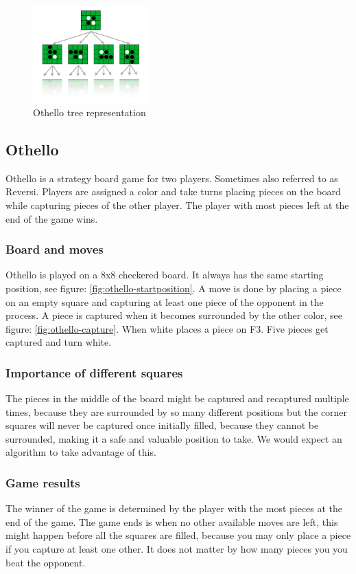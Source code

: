 \documentclass[10pt,letterpaper]{article}
\begin{document}
\begin{figure}[H]
    \centering
    \includegraphics[width=0.4\textwidth]{images/othello-gametree}
    \caption{Othello tree representation}
    \label{fig:othello-gametree}
\end{figure}
\subsection{Othello}
Othello is a strategy board game for two players. Sometimes also referred to as Reversi. Players are assigned a color and take turns placing pieces on the board while capturing pieces of the other player. The player with most pieces left at the end of the game wins.
\subsubsection{Board and moves}
Othello is played on a 8x8 checkered board. It always has the same starting position, see figure: \ref{fig:othello-startposition}. A move is done by placing a piece on an empty square and capturing at least one piece of the opponent in the process. A piece is captured when it becomes surrounded by the other color, see figure: \ref{fig:othello-capture}. When white places a piece on F3. Five pieces get captured and turn white.
\subsubsection{Importance of different squares} The pieces in the middle of the board might be captured and recaptured multiple times, because they are surrounded by so many different positions but the corner squares will never be captured once initially filled, because they cannot be surrounded, making it a safe and valuable position to take. We would expect an algorithm to take advantage of this.
\subsubsection{Game results} The winner of the game is determined by the player with the most pieces at the end of the game. The game ends is when no other available moves are left, this might happen before all the squares are filled, because you may only place a piece if you capture at least one other. It does not matter by how many pieces you you beat the opponent.
\end{document}
